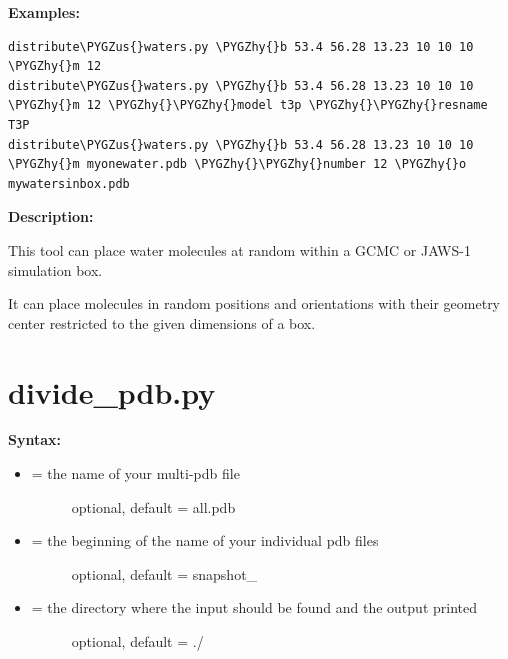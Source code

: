 \documentclass[letterpaper,10pt,english]{sphinxmanual}
\def\PYGZus{\char`\_}
\def\PYGZhy{\char`\-}
\begin{document}
\textbf{Examples:}

\begin{Verbatim}[frame=single,commandchars=\\\{\}]
distribute\PYGZus{}waters.py \PYGZhy{}b 53.4 56.28 13.23 10 10 10 \PYGZhy{}m 12
distribute\PYGZus{}waters.py \PYGZhy{}b 53.4 56.28 13.23 10 10 10 \PYGZhy{}m 12 \PYGZhy{}\PYGZhy{}model t3p \PYGZhy{}\PYGZhy{}resname T3P
distribute\PYGZus{}waters.py \PYGZhy{}b 53.4 56.28 13.23 10 10 10 \PYGZhy{}m myonewater.pdb \PYGZhy{}\PYGZhy{}number 12 \PYGZhy{}o mywatersinbox.pdb
\end{Verbatim}

\textbf{Description:}

This tool can place water molecules at random within a GCMC or JAWS-1 simulation box.

It can place molecules in random positions and orientations with their geometry center restricted to the given dimensions of a box.


\section{divide\_pdb.py}
\label{tools:divide-pdb-py}
\textbf{Syntax:}

\begin{itemize}
\item {} \begin{description}
\item[{ = the name of your multi-pdb file}] \leavevmode
optional, default = all.pdb

\end{description}

\item {} \begin{description}
\item[{ = the beginning of the name of your individual pdb files}] \leavevmode
optional, default = snapshot\_

\end{description}

\item {} \begin{description}
\item[{ = the directory where the input should be found and the output printed}] \leavevmode
optional, default = ./

\end{description}

\end{itemize}
\end{document}
